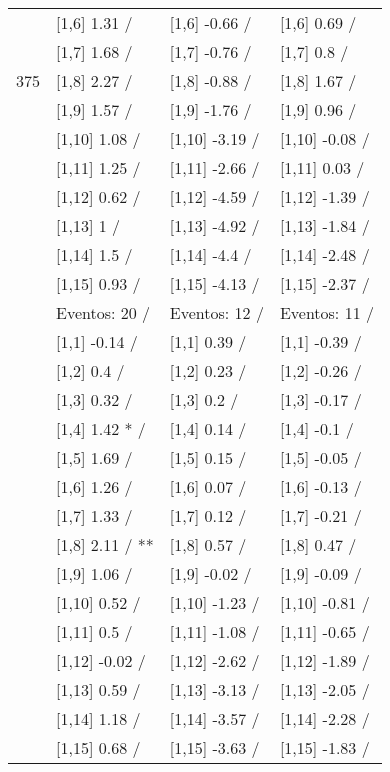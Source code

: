 \begin{table}
\begin{tabular}[t]{llll}
 & {}[1,6] 1.31  / & {}[1,6] -0.66  / & {}[1,6] 0.69  /\\
 & {}[1,7] 1.68  / & {}[1,7] -0.76  / & {}[1,7] 0.8  /\\
375 & {}[1,8] 2.27  / & {}[1,8] -0.88  / & {}[1,8] 1.67  /\\
\addlinespace
 & {}[1,9] 1.57  / & {}[1,9] -1.76  / & {}[1,9] 0.96  /\\
 & {}[1,10] 1.08  / & {}[1,10] -3.19  / & {}[1,10] -0.08  /\\
 & {}[1,11] 1.25  / & {}[1,11] -2.66  / & {}[1,11] 0.03  /\\
 & {}[1,12] 0.62  / & {}[1,12] -4.59  / & {}[1,12] -1.39  /\\
 & {}[1,13] 1  / & {}[1,13] -4.92  / & {}[1,13] -1.84  /\\
\addlinespace
 & {}[1,14] 1.5  / & {}[1,14] -4.4  / & {}[1,14] -2.48  /\\
 & {}[1,15] 0.93  / & {}[1,15] -4.13  / & {}[1,15] -2.37  /\\
 & Eventos:  20 / & Eventos:  12 / & Eventos:  11 /\\
 & {}[1,1] -0.14  / & {}[1,1] 0.39  / & {}[1,1] -0.39  /\\
 & {}[1,2] 0.4  / & {}[1,2] 0.23  / & {}[1,2] -0.26  /\\
\addlinespace
 & {}[1,3] 0.32  / & {}[1,3] 0.2  / & {}[1,3] -0.17  /\\
 & {}[1,4] 1.42 * / & {}[1,4] 0.14  / & {}[1,4] -0.1  /\\
 & {}[1,5] 1.69  / & {}[1,5] 0.15  / & {}[1,5] -0.05  /\\
 & {}[1,6] 1.26  / & {}[1,6] 0.07  / & {}[1,6] -0.13  /\\
 & {}[1,7] 1.33  / & {}[1,7] 0.12  / & {}[1,7] -0.21  /\\
\addlinespace
500 & {}[1,8] 2.11  / ** & {}[1,8] 0.57  / & {}[1,8] 0.47  /\\
 & {}[1,9] 1.06  / & {}[1,9] -0.02  / & {}[1,9] -0.09  /\\
 & {}[1,10] 0.52  / & {}[1,10] -1.23  / & {}[1,10] -0.81  /\\
 & {}[1,11] 0.5  / & {}[1,11] -1.08  / & {}[1,11] -0.65  /\\
 & {}[1,12] -0.02  / & {}[1,12] -2.62  / & {}[1,12] -1.89  /\\
\addlinespace
 & {}[1,13] 0.59  / & {}[1,13] -3.13  / & {}[1,13] -2.05  /\\
 & {}[1,14] 1.18  / & {}[1,14] -3.57  / & {}[1,14] -2.28  /\\
 & {}[1,15] 0.68  / & {}[1,15] -3.63  / & {}[1,15] -1.83  /\\
\bottomrule
\end{tabular}
\end{table}
